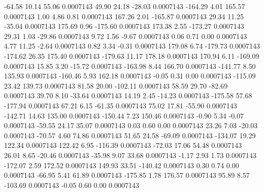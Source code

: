       -64.58       10.14       55.06     0.0007143
       49.90       24.18      -28.03     0.0007143
     -164.29        4.01      165.57     0.0007143
        1.00        4.86        0.81     0.0007143
      167.26        2.01     -165.87     0.0007143
       29.34       11.25      -35.04     0.0007143
      175.69        0.96     -175.60     0.0007143
      173.38        2.55     -173.27     0.0007143
       29.31        1.03      -29.86     0.0007143
        9.72        1.56       -9.67     0.0007143
        0.06        0.71        0.00     0.0007143
        4.77       11.25       -2.64     0.0007143
        0.82        3.34       -0.31     0.0007143
      179.08        6.74     -179.73     0.0007143
     -174.62       26.35      175.40     0.0007143
     -179.63       11.17      178.18     0.0007143
      170.94        6.11     -169.09     0.0007143
       15.85        3.20      -15.72     0.0007143
     -163.98        8.44      166.70     0.0007143
     -141.77        8.50      135.93     0.0007143
     -160.46        5.93      162.18     0.0007143
       -0.05        0.31        0.00     0.0007143
     -115.09       23.42      139.73     0.0007143
       81.58       20.00     -102.11     0.0007143
       58.59       29.70      -82.69     0.0007143
       39.70        8.10      -33.64     0.0007143
       14.19        2.45      -14.23     0.0007143
     -175.58       57.68     -177.94     0.0007143
       67.21        6.15      -61.35     0.0007143
       75.02       17.81      -55.90     0.0007143
     -142.71       14.63      135.00     0.0007143
     -150.44        7.23      150.46     0.0007143
       -0.90        5.34       -0.07     0.0007143
      -59.55       24.17       35.07     0.0007143
        0.03        0.60        0.00     0.0007143
       23.26        7.03      -20.03     0.0007143
      -70.57        4.60       74.86     0.0007143
       51.65       24.58      -69.09     0.0007143
     -134.07       19.29      122.34     0.0007143
      122.42        6.95     -116.39     0.0007143
      -72.03       17.06       54.48     0.0007143
       26.01        8.65      -20.46     0.0007143
      -35.98        9.07       33.68     0.0007143
       -1.17        2.93        1.73     0.0007143
     -172.07        2.59      172.52     0.0007143
      149.93       33.51     -140.42     0.0007143
        0.30        0.74        0.00     0.0007143
      -66.95        5.41       61.89     0.0007143
     -175.85        1.78      176.57     0.0007143
       95.89        8.57     -103.69     0.0007143
       -0.05        0.60        0.00     0.0007143
